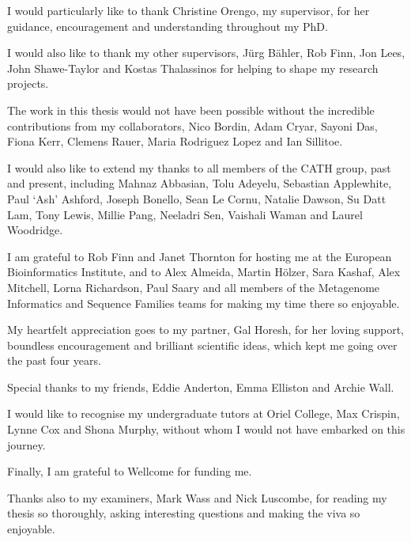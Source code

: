 \begin{acknowledgements}
I would particularly like to thank Christine Orengo, my supervisor, for her guidance, encouragement and understanding throughout my PhD.

I would also like to thank my other supervisors, Jürg Bähler, Rob Finn, Jon Lees, John Shawe-Taylor and Kostas Thalassinos for helping to shape my research projects.

The work in this thesis would not have been possible without the incredible contributions from my collaborators, Nico Bordin, Adam Cryar, Sayoni Das, Fiona Kerr, Clemens Rauer, Maria Rodriguez Lopez and Ian Sillitoe.

I would also like to extend my thanks to all members of the CATH group, past and present, including Mahnaz Abbasian, Tolu Adeyelu, Sebastian Applewhite, Paul `Ash' Ashford, Joseph Bonello, Sean Le Cornu, Natalie Dawson, Su Datt Lam, Tony Lewis, Millie Pang, Neeladri Sen, Vaishali Waman and Laurel Woodridge.

I am grateful to Rob Finn and Janet Thornton for hosting me at the European Bioinformatics Institute, and to Alex Almeida, Martin Hölzer, Sara Kashaf, Alex Mitchell, Lorna Richardson, Paul Saary and all members of the Metagenome Informatics and Sequence Families teams for making my time there so enjoyable.

My heartfelt appreciation goes to my partner, Gal Horesh, for her loving support, boundless encouragement and brilliant scientific ideas, which kept me going over the past four years.

Special thanks to my friends, Eddie Anderton, Emma Elliston and Archie Wall.

I would like to recognise my undergraduate tutors at Oriel College, Max Crispin, Lynne Cox and Shona Murphy, without whom I would not have embarked on this journey.

Finally, I am grateful to Wellcome for funding me.

Thanks also to my examiners, Mark Wass and Nick Luscombe, for reading my thesis so thoroughly, asking interesting questions and making the viva so enjoyable.
\end{acknowledgements}


\setcounter{tocdepth}{2}

\tableofcontents

\listoffigures
{}

